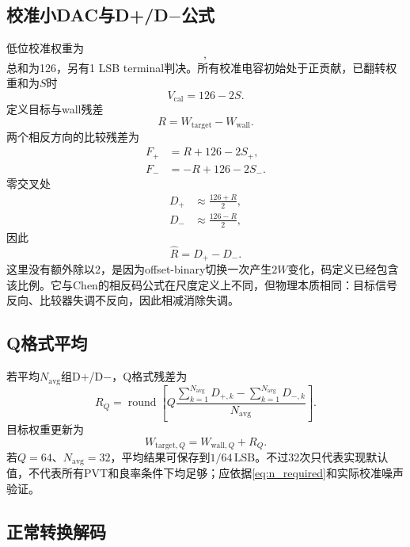 \documentclass[UTF8,a4paper,11pt]{ctexart}
\newcommand{\LSB}{\mathrm{LSB}}
\newcommand{\round}{\operatorname{round}}
\begin{document}
\subsection{校准小DAC与D+/D\texorpdfstring{$-$}{-}公式}

低位校准权重为
\begin{equation}
[48,32,20,12,8,4,2],
\end{equation}
总和为126，另有1 LSB terminal判决。所有校准电容初始处于正贡献，已翻转权重和为$S$时
\begin{equation}
V_{\mathrm{cal}}=126-2S.
\end{equation}
定义目标与wall残差
\begin{equation}
R=W_{\mathrm{target}}-W_{\mathrm{wall}}.
\end{equation}
两个相反方向的比较残差为
\begin{align}
F_+&=R+126-2S_+,\\
F_-&=-R+126-2S_-.
\end{align}
零交叉处
\begin{align}
D_+&\approx\frac{126+R}{2},\\
D_-&\approx\frac{126-R}{2},
\end{align}
因此
\begin{equation}
\boxed{\widehat R=D_+-D_-}.
\label{eq:dplus_dminus}
\end{equation}
这里没有额外除以2，是因为offset-binary切换一次产生$2W$变化，码定义已经包含该比例。它与Chen的相反码公式在尺度定义上不同，但物理本质相同：目标信号反向、比较器失调不反向，因此相减消除失调。

\subsection{Q格式平均}

若平均$N_{\mathrm{avg}}$组D+/D$-$，Q格式残差为
\begin{equation}
R_Q=\round\left[
Q\frac{\sum_{k=1}^{N_{\mathrm{avg}}}D_{+,k}-
\sum_{k=1}^{N_{\mathrm{avg}}}D_{-,k}}
{N_{\mathrm{avg}}}
\right].
\end{equation}
目标权重更新为
\begin{equation}
W_{\mathrm{target},Q}=W_{\mathrm{wall},Q}+R_Q.
\end{equation}
若$Q=64$、$N_{\mathrm{avg}}=32$，平均结果可保存到$1/64\,\LSB$。不过32次只代表实现默认值，不代表所有PVT和良率条件下均足够；应依据\cref{eq:n_required}和实际校准噪声验证。

\subsection{正常转换解码}
\end{document}
